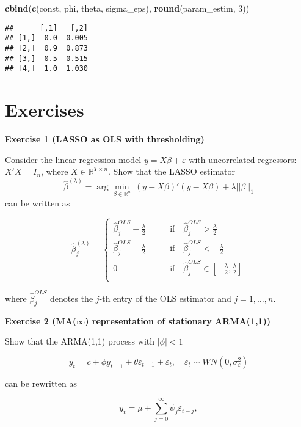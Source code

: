 \documentclass[
]{book}
\newenvironment{Shaded}{\begin{snugshade}}{\end{snugshade}}
\newcommand{\DecValTok}[1]{\textcolor[rgb]{0.00,0.00,0.81}{#1}}
\newcommand{\FunctionTok}[1]{\textcolor[rgb]{0.13,0.29,0.53}{\textbf{#1}}}
\newcommand{\NormalTok}[1]{#1}
\begin{document}
\begin{Shaded}
\begin{Highlighting}[]
\FunctionTok{cbind}\NormalTok{(}\FunctionTok{c}\NormalTok{(const, phi, theta, sigma\_eps), }\FunctionTok{round}\NormalTok{(param\_estim, }\DecValTok{3}\NormalTok{))}
\end{Highlighting}
\end{Shaded}

\begin{verbatim}
##      [,1]   [,2]
## [1,]  0.0 -0.005
## [2,]  0.9  0.873
## [3,] -0.5 -0.515
## [4,]  1.0  1.030
\end{verbatim}

\hypertarget{exercises}{%
\section{Exercises}\label{exercises}}

\textbf{Exercise 1 (LASSO as OLS with thresholding)}

Consider the linear regression model \(y = X\beta + \varepsilon\) with uncorrelated regressors: \(X'X = I_n\), where \(X\in\mathbb{R}^{T\times n}\). Show that the LASSO estimator
\[
\hat\beta^{(\lambda)} = \arg\min_{\beta \in \mathbb{R}^n} \ (y-X\beta)'(y-X\beta) + \lambda ||\beta||_1
\]
can be written as

\[
\hat\beta_j^{(\lambda)} = 
\begin{cases}
\hat\beta_j^{OLS} - \frac{\lambda}{2} & \qquad \text{if} \quad \hat\beta_j^{OLS} >  \frac{\lambda}{2} \\
\hat\beta_j^{OLS} + \frac{\lambda}{2} & \qquad \text{if} \quad \hat\beta_j^{OLS} <  -\frac{\lambda}{2} \\
0 & \qquad \text{if} \quad \hat\beta_j^{OLS} \in  \left[ -\frac{\lambda}{2}, \frac{\lambda}{2} \right]\\
\end{cases}
\]

where \(\hat\beta_j^{OLS}\) denotes the \(j\)-th entry of the OLS estimator and \(j = 1, \dots, n\).

\textbf{Exercise 2 (MA(\(\infty\)) representation of stationary ARMA(1,1))}

Show that the ARMA(1,1) process with \(|\phi| < 1\)

\[
y_t = c + \phi y_{t-1} + \theta \varepsilon_{t-1} + \varepsilon_t, \quad \varepsilon_t \sim WN(0, \sigma^2_\varepsilon)
\]

can be rewritten as

\[
y_t = \mu + \sum_{j=0}^\infty \psi_j \varepsilon_{t-j},
\]
\end{document}
